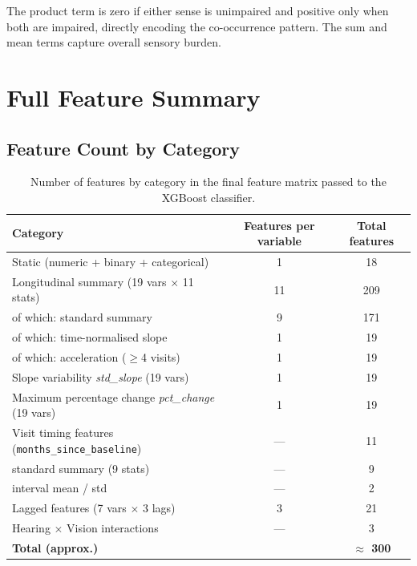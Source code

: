 \documentclass[11pt]{article}
\begin{document}
The product term is zero if either sense is unimpaired and positive only when both are impaired, directly encoding the co-occurrence pattern.  The sum and mean terms capture overall sensory burden.

\section{Full Feature Summary}
\label{sec:summary}

\subsection{Feature Count by Category}

\begin{table}[h!]
\centering
\caption{Number of features by category in the final feature matrix passed to the XGBoost classifier.}
\label{tab:feature_counts}
\begin{tabular}{@{}lcc@{}}
\toprule
\textbf{Category} & \textbf{Features per variable} & \textbf{Total features} \\
\midrule
Static (numeric + binary + categorical) & 1 & 18 \\
\midrule
Longitudinal summary (19 vars $\times$ 11 stats) & 11 & 209 \\
\quad of which: standard summary & 9 & 171 \\
\quad of which: time-normalised slope & 1 & 19 \\
\quad of which: acceleration ($\geq$4 visits) & 1 & 19 \\
\midrule
Slope variability \textit{std\_slope} (19 vars) & 1 & 19 \\
Maximum percentage change \textit{pct\_change} (19 vars) & 1 & 19 \\
\midrule
Visit timing features (\texttt{months\_since\_baseline}) & --- & 11 \\
\quad standard summary (9 stats) & --- & 9 \\
\quad interval mean / std & --- & 2 \\
\midrule
Lagged features (7 vars $\times$ 3 lags) & 3 & 21 \\
\midrule
Hearing $\times$ Vision interactions & --- & 3 \\
\midrule
\textbf{Total (approx.)} & & \textbf{$\approx$ 300} \\
\bottomrule
\end{tabular}
\end{table}
\end{document}
